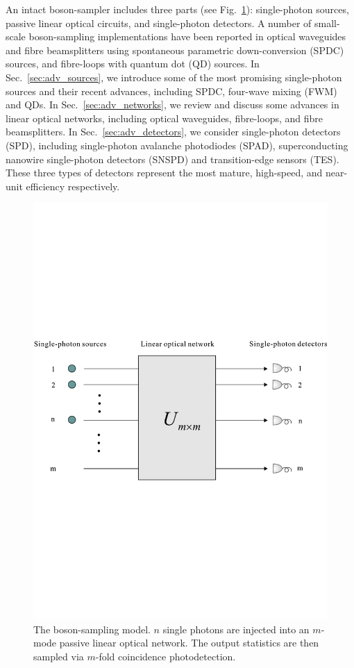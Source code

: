 \documentclass[aps,rmp,twocolumn,amsmath,amssymb,nofootinbib,superscriptaddress]{revtex4}
\begin{document}
An intact boson-sampler includes three parts (see Fig.~\ref{fig:model}): single-photon sources, passive linear optical circuits, and single-photon detectors. A number of small-scale boson-sampling implementations have been reported in optical waveguides \cite{bib:4, bib:5, bib:6, bib:7, bib:8, bib:9} and fibre beamsplitters \cite{bib:10} using spontaneous parametric down-conversion (SPDC) sources, and fibre-loops \cite{bib:11} with quantum dot (QD) sources. In Sec.~\ref{sec:adv_sources}, we introduce some of the most promising single-photon sources and their recent advances, including SPDC, four-wave mixing (FWM) and QDs. In Sec.~\ref{sec:adv_networks}, we review and discuss some advances in linear optical networks, including optical waveguides, fibre-loops, and fibre beamsplitters. In Sec.~\ref{sec:adv_detectors}, we consider single-photon detectors (SPD), including single-photon avalanche photodiodes (SPAD), superconducting nanowire single-photon detectors (SNSPD) and transition-edge sensors (TES). These three types of detectors represent the most mature, high-speed, and near-unit efficiency respectively.

\begin{figure}[!htb]
\includegraphics[width=\columnwidth]{model}
\caption{The boson-sampling model. $n$ single photons are injected into an $m$-mode passive linear optical network. The output statistics are then sampled via $m$-fold coincidence photodetection.} \label{fig:model}
\end{figure}
\end{document}
